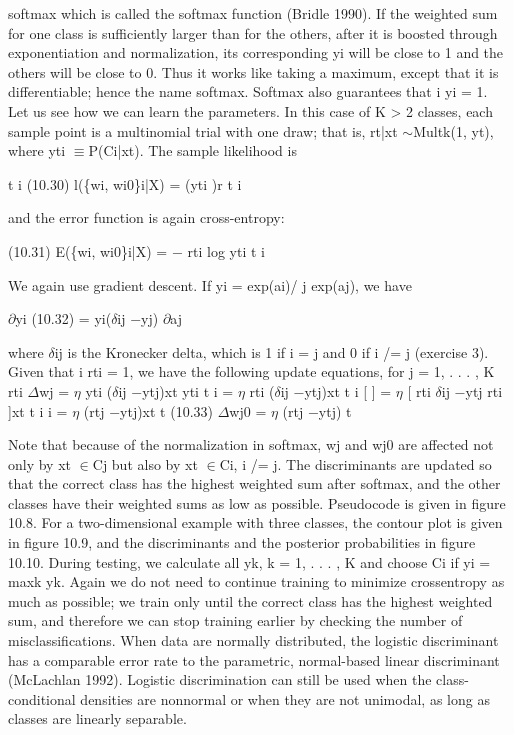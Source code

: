 softmax which is called the softmax function (Bridle 1990). If the weighted sum for one class is sufficiently larger than for the others, after it is boosted through exponentiation and normalization, its corresponding yi will be close to 1 and the others will be close to 0. Thus it works like taking a maximum, except that it is differentiable; hence the name softmax. Softmax also guarantees that i yi = 1. Let us see how we can learn the parameters. In this case of K > 2 classes, each sample point is a multinomial trial with one draw; that is, rt|xt $\sim$Multk(1, yt), where yti $\equiv$P(Ci|xt). The sample likelihood is

t i (10.30) l(\{wi, wi0\}i|X) = (yti )r t i

and the error function is again cross-entropy:

(10.31) E(\{wi, wi0\}i|X) = $-$ rti log yti t i

We again use gradient descent. If yi = exp(ai)/ j exp(aj), we have

$\partial$yi (10.32) = yi($\delta$ij $-$yj) $\partial$aj

where $\delta$ij is the Kronecker delta, which is 1 if i = j and 0 if i /= j (exercise 3). Given that i rti = 1, we have the following update equations, for j = 1, . . . , K rti $\Delta$wj = $\eta$ yti ($\delta$ij $-$ytj)xt yti t i = $\eta$ rti ($\delta$ij $-$ytj)xt t i [ ] = $\eta$ [ rti $\delta$ij $-$ytj rti ]xt t i i = $\eta$ (rtj $-$ytj)xt t (10.33) $\Delta$wj0 = $\eta$ (rtj $-$ytj) t

Note that because of the normalization in softmax, wj and wj0 are affected not only by xt $\in$Cj but also by xt $\in$Ci, i /= j. The discriminants are updated so that the correct class has the highest weighted sum after softmax, and the other classes have their weighted sums as low as possible. Pseudocode is given in figure 10.8. For a two-dimensional example with three classes, the contour plot is given in figure 10.9, and the discriminants and the posterior probabilities in figure 10.10. During testing, we calculate all yk, k = 1, . . . , K and choose Ci if yi = maxk yk. Again we do not need to continue training to minimize crossentropy as much as possible; we train only until the correct class has the highest weighted sum, and therefore we can stop training earlier by checking the number of misclassifications. When data are normally distributed, the logistic discriminant has a comparable error rate to the parametric, normal-based linear discriminant (McLachlan 1992). Logistic discrimination can still be used when the class-conditional densities are nonnormal or when they are not unimodal, as long as classes are linearly separable.

